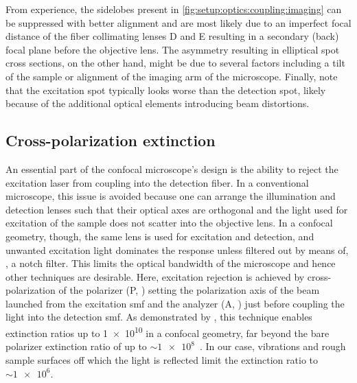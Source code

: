 From experience, the sidelobes present in \cref{fig:setup:optics:coupling:imaging} can be suppressed with better alignment and are most likely due to an imperfect focal distance of the fiber collimating lenses D and E resulting in a secondary (back) focal plane before the objective lens.
The asymmetry resulting in elliptical spot cross sections, on the other hand, might be due to several factors including a tilt of the sample or alignment of the imaging arm of the microscope.
Finally, note that the excitation spot typically looks worse than the detection spot, likely because of the additional optical elements introducing beam distortions.

\subsection{Cross-polarization extinction}\label{subsec:setup:optics:coupling:rejection}
An essential part of the confocal microscope's design is the ability to reject the excitation laser from coupling into the detection fiber.
In a conventional microscope, this issue is avoided because one can arrange the illumination and detection lenses such that their optical axes are orthogonal and the light used for excitation of the sample does not scatter into the objective lens.
In a confocal geometry, though, the same lens is used for excitation and detection, and unwanted excitation light dominates the response unless filtered out by means of, \eg, a notch filter.
This limits the optical bandwidth of the microscope and hence other techniques are desirable.
Here, excitation rejection is achieved by cross-polarization of the polarizer (P, \polarizer) setting the polarization axis of the beam launched from the excitation \gls{smf} and the analyzer (A, \polarizer) just before coupling the light into the detection \gls{smf}.
As demonstrated by \citet{Benelajla2021}, this technique enables extinction ratios
up to \num{1e10} in a confocal geometry, far beyond the bare polarizer extinction ratio of up to $\sim\num{1e8}$~\cite{ThorlabsLPVIS050-MP2}.
In our case, vibrations and rough sample surfaces off which the light is reflected limit the extinction ratio to $\sim\num{1e6}$.

